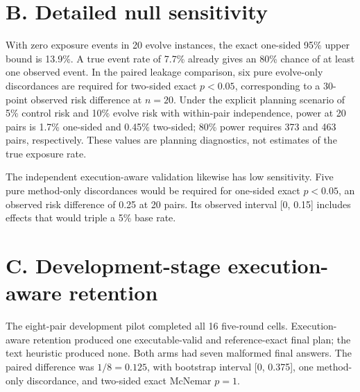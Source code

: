 \documentclass{article}
\begin{document}
\section{B. Detailed null sensitivity}

With zero exposure events in 20 evolve instances, the exact one-sided 95\% upper bound is 13.9\%. A true event rate of 7.7\% already gives an 80\% chance of at least one observed event. In the paired leakage comparison, six pure evolve-only discordances are required for two-sided exact \(p<0.05\), corresponding to a 30-point observed risk difference at \(n=20\). Under the explicit planning scenario of 5\% control risk and 10\% evolve risk with within-pair independence, power at 20 pairs is 1.7\% one-sided and 0.45\% two-sided; 80\% power requires 373 and 463 pairs, respectively. These values are planning diagnostics, not estimates of the true exposure rate.

The independent execution-aware validation likewise has low sensitivity. Five pure method-only discordances would be required for one-sided exact \(p<0.05\), an observed risk difference of 0.25 at 20 pairs. Its observed interval [0, 0.15] includes effects that would triple a 5\% base rate.

\section{C. Development-stage execution-aware retention}

The eight-pair development pilot completed all 16 five-round cells. Execution-aware retention produced one executable-valid and reference-exact final plan; the text heuristic produced none. Both arms had seven malformed final answers. The paired difference was \(1/8=0.125\), with bootstrap interval [0, 0.375], one method-only discordance, and two-sided exact McNemar \(p=1\).

\begin{center}
\end{center}
\end{document}

